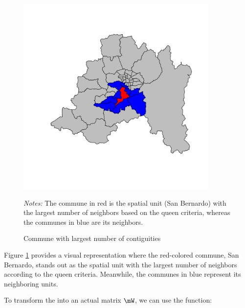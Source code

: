 \documentclass[english,12pt]{book}\usepackage[]{graphicx}\usepackage[]{xcolor}
\newenvironment{knitrout}{}{} %
\begin{document}
\begin{figure}[ht]
  \caption{Commune with largest number of contiguities}
    \label{fig:plot_nn}
    \centering
        	\begin{minipage}{1\linewidth}
\begin{knitrout}
\color{fgcolor}

{\centering \includegraphics[width=10cm,height=10cm]{figure/neight-1} 

}


\end{knitrout}
\footnotesize
		\emph{Notes:} The commune in red is the spatial unit (San Bernardo) with the largest number of neighbors based on the queen criteria, whereas the communes in blue are its neighbors. 
	\end{minipage}	
\end{figure}

Figure \ref{fig:plot_nn} provides a visual representation where the red-colored commune, San Bernardo, stands out as the spatial unit with the largest number of neighbors according to the queen criteria. Meanwhile, the communes in blue represent its neighboring units.

To transform the  into an actual matrix $\mW$, we can use the  function:
\end{document}
